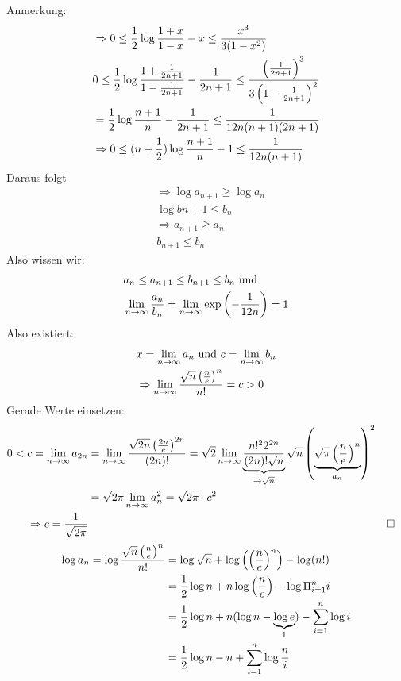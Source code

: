 Anmerkung:
\begin{align*}
    &\Rightarrow 0 \leq \frac{1}{2} \log \frac{1 +x}{1-x} - x \leq \frac{x^3}{3(1- x^2)}\\
    &0 \leq \frac{1}{2} \log \frac{1 + \frac{1}{2n+1}}{1 - \frac{1}{2n+1}} - \frac{1}{2n+1} \leq \frac{\left(\frac{1}{2n+1}\right)^3}{3\left(1 - \frac{1}{2n+1}\right)^2}\\
    &= \frac{1}{2} \log \frac{n+1}{n} - \frac{1}{2n+1} \leq \frac{1}{12n(n+1)(2n+1)}\\
    &\Rightarrow 0 \leq (n + \frac{1}{2}) \log \frac{n+1}{n} - 1 \leq \frac{1}{12n(n+1)}
\end{align*}
Daraus folgt
\begin{align*}
    &\Rightarrow \log a_{n+1} \geq \log a_n\\
    &\log b{n+1} \leq b_n\\
    &\Rightarrow a_{n+1} \geq a_n\\
    &b_{n+1} \leq b_n
\end{align*}
Also wissen wir:
\begin{align*}
    &a_n \leq a_{n+1} \leq b_{n+1} \leq b_n \text{ und }\\ &\lim_{n \rightarrow \infty} \frac{a_n}{b_n} = \lim_{n \rightarrow \infty} \exp\left( - \frac{1}{12n}\right) = 1
\end{align*}
Also existiert:
\begin{align*}
    &x = \lim_{n \rightarrow \infty} a_n \text{ und } c = \lim_{n \rightarrow \infty} b_n\\
    &\Rightarrow \lim_{n \rightarrow \infty} \frac{\sqrt{n} \left(\frac{n}{e}\right)^n}{n!} = c > 0
\end{align*}
Gerade Werte einsetzen:
\begin{align*}
    0 < c = \lim_{n \rightarrow \infty} a_{2n} &= \lim_{n \rightarrow \infty} \frac{\sqrt{2n}\left(\frac{2n}{e}\right)^{2n}}{(2n)!} = \sqrt{2} \lim_{n \rightarrow \infty} \underbrace{\frac{n!^22^{2n}}{(2n)! \sqrt{n}}}_{\rightarrow \sqrt{n}} \sqrt{n} \left( \underbrace{\sqrt{\pi} \left(\frac{n}{e}\right)^n}_{a_n}\right)^2\\
    &= \sqrt{2\pi} \lim_{n \rightarrow \infty} a^2_n = \sqrt{2\pi} \cdot c^2\\
    \Rightarrow c = \frac{1}{\sqrt{2\pi}} &&&\square
\end{align*}
\newcommand{\ndurche}{\left(\frac{n}{e}\right)}
\renewcommand{\summeeinsbisn}{\sum_{i = 1}^{n}}
\begin{align*}
    \log a_n = \log \frac{\sqrt{n} \ndurche^n}{n!} &= \log \sqrt{n} + \log \left(\ndurche^n\right) - \log (n!)\\
    &= \frac{1}{2} \log n + n \log \ndurche - \log \pivoneinsbisn i\\
    &= \frac{1}{2} \log n + n(\log n  - \underbrace{\log e}_{1}) - \sum_{i = 1}^n \log i\\
    &= \frac{1}{2} \log n - n + \sum_{i=1}^{n} \log \frac{n}{i}
\end{align*}

